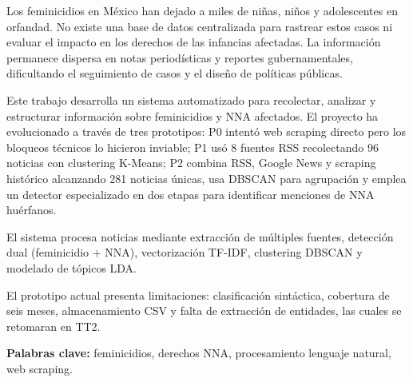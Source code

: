 
Los feminicidios en México han dejado a miles de niñas, niños y adolescentes en orfandad. No existe una base de datos centralizada para rastrear estos casos ni evaluar el impacto en los derechos de las infancias afectadas. La información permanece dispersa en notas periodísticas y reportes gubernamentales, dificultando el seguimiento de casos y el diseño de políticas públicas.

Este trabajo desarrolla un sistema automatizado para recolectar, analizar y estructurar información sobre feminicidios y NNA afectados. El proyecto ha evolucionado a través de tres prototipos: P0 intentó web scraping directo pero los bloqueos técnicos lo hicieron inviable; P1 usó 8 fuentes RSS recolectando 96 noticias con clustering K-Means; P2 combina RSS, Google News y scraping histórico alcanzando 281 noticias únicas, usa DBSCAN para agrupación y emplea un detector especializado en dos etapas para identificar menciones de NNA huérfanos.

El sistema procesa noticias mediante extracción de múltiples fuentes, detección dual (feminicidio + NNA), vectorización TF-IDF, clustering DBSCAN y modelado de tópicos LDA. 

El prototipo actual presenta limitaciones: clasificación sintáctica, cobertura de seis meses, almacenamiento CSV y falta de extracción de entidades, las cuales se retomaran en TT2.

\vspace{1cm}
\noindent\textbf{Palabras clave:} feminicidios, derechos NNA, procesamiento lenguaje natural, web scraping.
